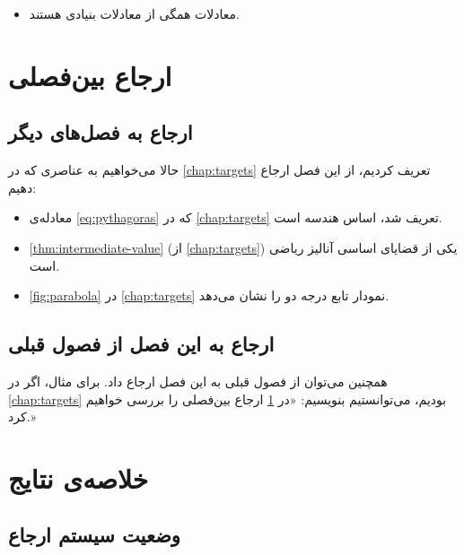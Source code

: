 \documentclass{matinbook}
\begin{document}
\begin{itemize}
    \item معادلات 
    همگی از معادلات بنیادی هستند.
\end{itemize}

\chapter{ارجاع بین‌فصلی}
\label{chap:cross-chapter}

\section{ارجاع به فصل‌های دیگر}
\label{sec:cross-chapters}

حالا می‌خواهیم به عناصری که در \cref{chap:targets}
تعریف کردیم، از این فصل ارجاع دهیم:

\begin{itemize}
    \item معادله‌ی \cref{eq:pythagoras} که در
    \cref{chap:targets} تعریف شد، اساس هندسه است.
    \item \cref{thm:intermediate-value} (از
    \cref{chap:targets}) یکی از قضایای اساسی آنالیز
    ریاضی است.
    \item \cref{fig:parabola} در \cref{chap:targets}
    نمودار تابع درجه دو را نشان می‌دهد.
\end{itemize}

\section{ارجاع به این فصل از فصول قبلی}
\label{sec:cross-backward}

همچنین می‌توان از فصول قبلی به این فصل ارجاع داد.
برای مثال، اگر در \cref{chap:targets} بودیم،
می‌توانستیم بنویسیم:
«در \cref{chap:cross-chapter} ارجاع بین‌فصلی را
بررسی خواهیم کرد.»

\chapter{خلاصه‌ی نتایج}
\label{chap:summary}

\section{وضعیت سیستم ارجاع}
\label{sec:summary-status}
\end{document}
